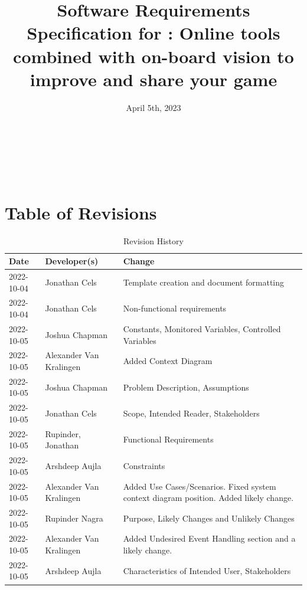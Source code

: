 \documentclass[12pt]{article}
\begin{document}
\title{Software Requirements Specification for \progname{}: Online tools combined with on-board vision to improve and share your game} 
\author{\authname}
\date{April 5th, 2023}
	
\maketitle

~\newpage

\tableofcontents

~\newpage

\section*{Table of Revisions}
\begin{center}
    \renewcommand*{\arraystretch}{1.6}
    \begin{longtable}{m{2.5cm} m{5cm} m{7cm}}
    \caption{Revision History}\\
    \hline
    \textbf{Date} & \textbf{Developer(s)} & \textbf{Change}\\
    \hline
    \endhead
    2022-10-04 & Jonathan Cels & Template creation and document formatting\\ 
    2022-10-04 & Jonathan Cels & Non-functional requirements\\
    2022-10-05 & Joshua Chapman & Constants, Monitored Variables, Controlled Variables\\
    2022-10-05 & Alexander Van Kralingen & Added Context Diagram\\
    2022-10-05 & Joshua Chapman & Problem Description, Assumptions \\
    2022-10-05 & Jonathan Cels & Scope, Intended Reader, Stakeholders\\
    2022-10-05 & Rupinder, Jonathan & Functional Requirements\\
    2022-10-05 & Arshdeep Aujla & Constraints\\
    2022-10-05 & Alexander Van Kralingen & Added Use Cases/Scenarios. Fixed system context diagram position. Added likely change.\\
    2022-10-05 & Rupinder Nagra & Purpose, Likely Changes and Unlikely Changes\\
    2022-10-05 & Alexander Van Kralingen & Added Undesired Event Handling section and a likely change.\\
    2022-10-05 & Arshdeep Aujla & Characteristics of Intended User, Stakeholders\\

\end{longtable}
\end{center}
\end{document}
